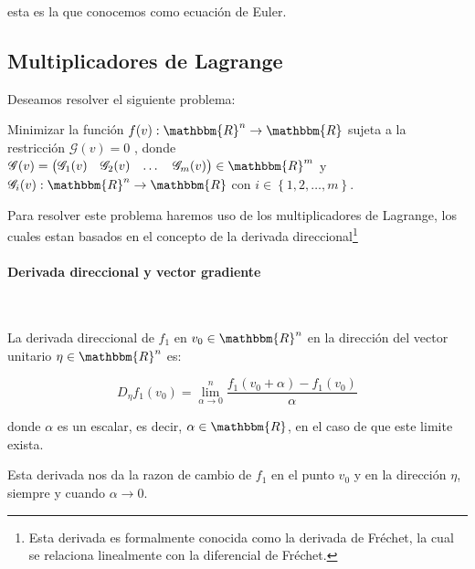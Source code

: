             esta es la que conocemos como ecuación de Euler.


        \subsection{Multiplicadores de Lagrange}

            Deseamos resolver el siguiente problema:

            Minimizar la función
            $f(v):\mathbbm{R}^n \to \mathbbm{R}$ sujeta a la restricción $\mathscr{G}(v) = 0$
            , donde $\mathscr{G}(v)=\begin{pmatrix}\mathscr{G}_1(v) & \mathscr{G}_2(v) & \dots & \mathscr{G}_m(v) \end{pmatrix} \in \mathbbm{R}^m$
             y $\mathscr{G}_i(v): \mathbbm{R}^n \to \mathbbm{R}$
             con $i \in \left\{ 1, 2, \dots, m \right\}$.

            Para resolver este problema haremos uso de los multiplicadores de Lagrange, los cuales estan basados en el concepto de la derivada direccional\footnote{Esta derivada es formalmente conocida como la derivada de Fréchet, la cual se relaciona linealmente con la diferencial de Fréchet.}

            \paragraph{Derivada direccional y vector gradiente}\mbox{}\\

                \begin{definicion}
                    La derivada direccional de $f_1$ en $v_0 \in \mathbbm{R}^n$ en la dirección del vector unitario $\eta \in \mathbbm{R}^n$ es:

                    \begin{equation}
                        D_{\eta} f_1(v_0) = \lim_{\alpha \to 0}^{n}  \frac{f_1(v_0 + \alpha) - f_1(v_0)}{\alpha}
                    \end{equation}

                    donde $\alpha$ es un escalar, es decir, $\alpha \in \mathbbm{R}$, en el caso de que este limite exista.

                    Esta derivada nos da la razon de cambio de $f_1$ en el punto $v_0$ y en la dirección $\eta$, siempre y cuando $\alpha \to 0$.
                \end{definicion}

